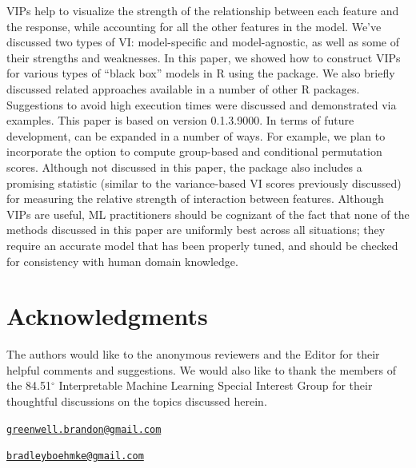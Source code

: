 VIPs help to visualize the strength of the relationship between each
feature and the response, while accounting for all the other features in
the model. We've discussed two types of VI: model-specific and
model-agnostic, as well as some of their strengths and weaknesses. In
this paper, we showed how to construct VIPs for various types of ``black
box'' models in R using the  package. We also briefly discussed
related approaches available in a number of other R packages.
Suggestions to avoid high execution times were discussed and
demonstrated via examples. This paper is based on  version
0.1.3.9000. In terms of future development,  can be expanded in
a number of ways. For example, we plan to incorporate the option to
compute group-based and conditional permutation scores. Although not
discussed in this paper, the package also includes a promising statistic
(similar to the variance-based VI scores previously discussed) for
measuring the relative strength of interaction between features.
Although VIPs are useful, ML practitioners should be cognizant of the
fact that none of the methods discussed in this paper are uniformly best
across all situations; they require an accurate model that has been
properly tuned, and should be checked for consistency with human domain
knowledge.

\section{Acknowledgments}

The authors would like to the anonymous reviewers and the Editor for
their helpful comments and suggestions. We would also like to thank the
members of the 84.51\(^{\circ}\) Interpretable Machine Learning Special
Interest Group for their thoughtful discussions on the topics discussed
herein.




\address{%
Brandon M. Greenwell\\
University of Cincinnati\\
2925 Campus Green Dr\\ Cincinnati, OH 45221\\ United States of America\\ ORCiD---\href{https://orcid.org/0000-0002-8120-0084}{0000-0002-8120-0084}\\
}
\href{mailto:greenwell.brandon@gmail.com}{\nolinkurl{greenwell.brandon@gmail.com}}

\address{%
Bradley C. Boehmke\\
University of Cincinnati\\
2925 Campus Green Dr\\ Cincinnati, OH 45221\\ United States of America\\ ORCiD---\href{https://orcid.org/0000-0002-3611-8516}{0000-0002-3611-8516}\\
}
\href{mailto:bradleyboehmke@gmail.com}{\nolinkurl{bradleyboehmke@gmail.com}}

